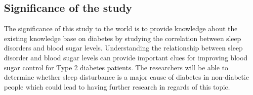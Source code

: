 \subsection*{Significance of the study}
The significance of this study to the world is to provide knowledge about the
existing knowledge base on diabetes by studying the correlation between sleep
disorders and blood sugar levels. Understanding the relationship between sleep
disorder and blood sugar levels can provide important clues for improving blood
sugar control for Type 2 diabetes patients. The researchers will be able to
determine whether sleep disturbance is a major cause of diabetes in non-diabetic
people which could lead to having further research in regards of this topic.
